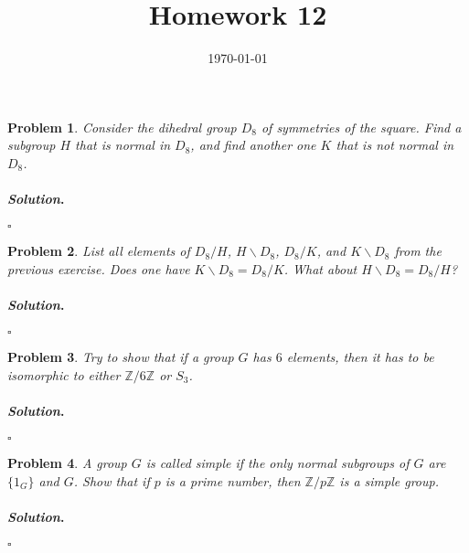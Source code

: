 \documentclass[reqno]{amsart}
\theoremstyle{plain}
\newtheorem{problem}{Problem}
\theoremstyle{definition}
\newenvironment{solution}{\paragraph{\emph{Solution}.}}{\hfill$\square$}
\begin{document}
 

\title[Homework 12]{Homework 12}

\date{\today} 
\maketitle 


\begin{problem}
Consider the dihedral group $D_{8}$ of symmetries of the square.  Find a subgroup $H$ that is normal in $D_{8}$, and find another one $K$ that is not normal in $D_{8}$.
\end{problem}
\begin{solution}

\end{solution}

\begin{problem}
List all elements of $D_{8}\slash H$, $H \backslash D_{8}$, $D_{8}/K$, and $K \backslash D_{8}$ from the previous exercise.  Does one have $K \backslash D_{8} = D_{8}/K$.  What about $H \backslash D_{8} = D_{8}/H$?
\end{problem}
\begin{solution}

\end{solution}


\begin{problem}
Try to show that if a group $G$ has $6$ elements, then it has to be isomorphic to either $\mathbb{Z}/6\mathbb{Z}$ or $S_{3}$.
\end{problem}
\begin{solution}

\end{solution}



\begin{problem}
A group $G$ is called simple if the only normal subgroups of $G$ are $\{ 1_{G}\}$ and $G$.  Show that if $p$ is a prime number, then $\mathbb{Z}/p\mathbb{Z}$ is a simple group.
\end{problem}
\begin{solution}

\end{solution}
\end{document}
